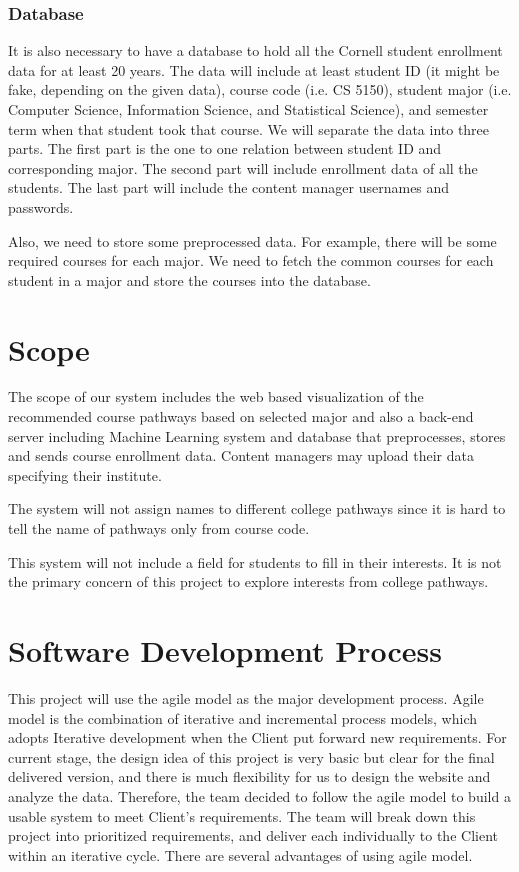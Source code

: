 \documentclass{article}
\begin{document}
\subsubsection{Database}
It is also necessary to have a database to hold all the Cornell student enrollment data for at least 20 years. The data will include at least student ID (it might be fake, depending on the given data), course code (i.e. CS 5150), student major (i.e. Computer Science, Information Science, and Statistical Science), and semester term when that student took that course. We will separate the data into three parts. The first part is the one to one relation between student ID and corresponding major. The second part will include enrollment data of all the students. The last part will include the content manager usernames and passwords.

\vspace{0.4cm}Also, we need to store some preprocessed data. For example, there will be some required courses for each major. We need to fetch the common courses for each student in a major and store the courses into the database.

\section{Scope}
The scope of our system includes the web based visualization of the recommended course pathways based on selected major and also a back-end server including Machine Learning system and database that preprocesses, stores and sends course enrollment data. Content managers may upload their data specifying their institute.

\vspace{0.4cm}The system will not assign names to different college pathways since it is hard to tell the name of pathways only from course code.

\vspace{0.4cm}This system will not include a field for students to fill in their interests. It is not the primary concern of this project to explore interests from college pathways.

\section{Software Development Process}
This project will use the agile model as the major development process. Agile model is the combination of iterative and incremental process models, which adopts Iterative development when the Client put forward new requirements. For current stage, the design idea of this project is very basic but clear for the final delivered version, and there is much flexibility for us to design the website and analyze the data. Therefore, the team decided to follow the agile model to build a usable system to meet Client’s requirements. The team will break down this project into prioritized requirements, and deliver each individually to the Client within an iterative cycle. There are several advantages of using agile model.
\end{document}
